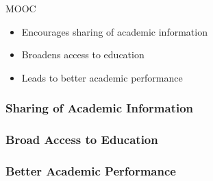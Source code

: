 \documentclass{beamer}
\begin{document}
\begin{spacing}{1.2}
\begin{frame}
	MOOC
	\begin{itemize}
			\item Encourages sharing of academic information
			\item Broadens access to education
			\item Leads to better academic performance
	\end{itemize}
\end{frame}

\begin{frame}
	\frametitle{Sharing of Academic Information}
\end{frame}

\begin{frame}
	\frametitle{Broad Access to Education}
\end{frame}

\begin{frame}
	\frametitle{Better Academic Performance}
\end{frame}

%

\begin{frame}\end{frame}

\end{spacing}
\end{document}
